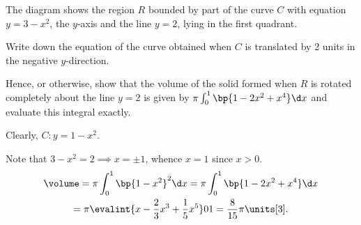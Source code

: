 \clearpage
\begin{problem}
    The diagram shows the region $R$ bounded by part of the curve $C$ with equation $y = 3 - x^2$, the $y$-axis and the line $y = 2$, lying in the first quadrant.

    \begin{center}
    \end{center}

    Write down the equation of the curve obtained when $C$ is translated by 2 units in the negative $y$-direction.

    Hence, or otherwise, show that the volume of the solid formed when $R$ is rotated completely about the line $y = 2$ is given by $\pi \int_0^1 \bp{1 - 2x^2 + x^4} \d x$ and evaluate this integral exactly.
\end{problem}
\begin{solution}
    Clearly, $C: y = 1-x^2$.

    Note that $3 - x^2 = 2 \implies x = \pm 1$, whence $x = 1$ since $x > 0$.
    \begin{gather*}
        \volume = \pi\int_0^1 \bp{1 - x^2}^2 \d x = \pi\int_0^1 \bp{1 - 2x^2 + x^4} \d x\\
        = \pi \evalint{x - \frac23 x^3 + \frac15 x^5}01 = \frac{8}{15} \pi \units[3].
    \end{gather*}
\end{solution}

